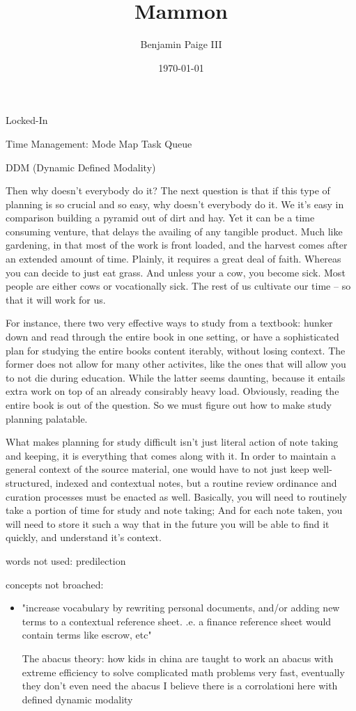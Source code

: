 \title{\bf Mammon}
\author{Benjamin Paige III}
\date{\today}



Locked-In

Time Management:
Mode Map
Task Queue

DDM (Dynamic Defined Modality)

Then why doesn't everybody do it?
	The next question is that if this type of planning is so crucial and so easy, why doesn't everybody do it.  We it's easy in comparison building a pyramid out of dirt and hay.
	Yet it can be a time consuming venture, that delays the availing of any tangible product. Much like gardening, in that most of the work is front loaded, and the harvest comes
	after an extended amount of time.  Plainly, it requires a great deal of faith.  Whereas you can decide to just eat grass.  And unless your a cow, you become sick.  
	Most people are either cows or vocationally sick.  The rest of us cultivate our time -- so that it will work for us.

	For instance, there two very effective ways to study from a textbook: hunker down and read through the entire book in one setting, or have a sophisticated plan for studying the
	entire books content iterably, without losing context.  The former does not allow for many other activites, like the ones that will allow you to not die during education.  While
	the latter seems daunting, because it entails extra work on top of an already consirably heavy load.  Obviously, reading the entire book is out of the question.  So we must 
	figure out how to make study planning palatable.

	What makes planning for study difficult isn't just literal action of note taking and keeping, it is everything that comes along with it.  In order to maintain a general context
	of the source material, one would have to not just keep well-structured, indexed and contextual notes, but a routine review ordinance and curation processes must be enacted as well.
	Basically, you will need to routinely take a portion of time for study and note taking; And for each note taken, you will need to store it such a way that in the future you will be able to find it quickly, and understand it's context.

words not used:
predilection


concepts not broached:

\begin{itemize}
\item
"increase vocabulary by rewriting personal documents, and/or adding new terms to a contextual reference sheet.
.e. a finance reference sheet would contain terms like escrow, etc"

The abacus theory: how kids in china are taught to work an abacus with extreme efficiency
to solve complicated math problems very fast, eventually they don't even need the abacus
I believe there is a corrolationi here with defined dynamic modality
\end{itemize}

